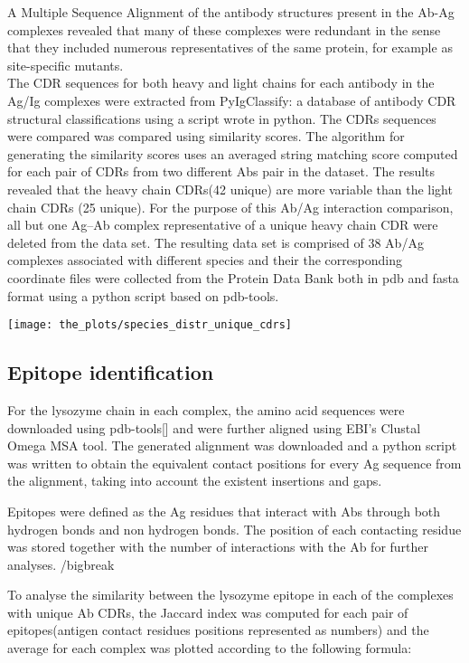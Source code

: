 \documentclass{article}
\begin{document}
A Multiple Sequence Alignment of the antibody structures present in the Ab-Ag complexes revealed that many of these complexes were redundant in the sense that they included numerous representatives of the same protein, for example as site-specific mutants. 
 \\
The CDR sequences for both heavy and light chains for each antibody in the Ag/Ig complexes were extracted from PyIgClassify: a database of antibody CDR structural classifications using a script wrote in python.  The CDRs sequences were compared was compared using similarity scores. The algorithm for generating the similarity scores uses an averaged string matching score computed for each pair of CDRs from two different Abs pair in the dataset. The results revealed that the heavy chain CDRs(42 unique) are more variable than the light chain CDRs (25 unique). For the purpose of this Ab/Ag interaction comparison, all but one Ag–Ab complex representative of a unique heavy chain CDR were deleted from the data set. The resulting data set is comprised of 38 Ab/Ag complexes associated with different species and their the corresponding coordinate files were collected from the Protein Data Bank both in pdb and fasta format using a python script based on pdb-tools.
\begin{center}
	\texttt{[image: the\_plots/species\_distr\_unique\_cdrs]}
	 \label{pix:specdistr} %
\end{center}


\newpage
\subsection{Epitope identification}
For the lysozyme chain in each complex, the amino acid sequences were downloaded using pdb-tools[] and were further aligned using EBI's Clustal Omega MSA tool. The generated alignment was downloaded and a python script was written to obtain the equivalent contact positions for every Ag sequence from the alignment, taking into account the existent insertions and gaps. 


Epitopes were defined as the Ag residues that interact with Abs through both hydrogen bonds and non hydrogen bonds. The position of each contacting residue was stored together with the number of interactions with the Ab for further analyses.
/bigbreak

To analyse the similarity between the lysozyme epitope in each of the complexes with unique Ab CDRs, the Jaccard index was computed for each pair of epitopes(antigen contact residues positions represented as numbers) and the average for each complex was plotted according to the following formula:
\end{document}
